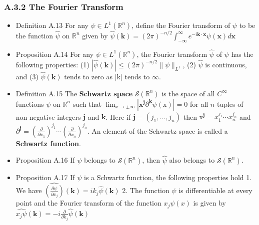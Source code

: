 \subsubsection{A.3.2 The Fourier Transform}

\begin{itemize}
\item Definition A.13 For any $\psi \in L^{1}\left(\mathbb{R}^{n}\right)$, define the Fourier transform of $\psi$ to be the function $\hat{\psi}$ on $\mathbb{R}^{n}$ given by $\hat{\psi}(\mathbf{k})=(2 \pi)^{-n / 2} \int_{-\infty}^{\infty} e^{-i \mathbf{k} \cdot \mathbf{x}} \psi(\mathbf{x}) d \mathbf{x}$

\item Proposition A.14 For any $\psi \in L^{1}\left(\mathbb{R}^{n}\right)$, the Fourier transform $\hat{\psi}$ of $\psi$ has the following properties: (1) $|\hat{\psi}(\mathbf{k})| \leq(2 \pi)^{-n / 2}\|\psi\|_{L^{1}}$, (2) $\hat{\psi}$ is continuous, and (3) $\hat{\psi}(\mathbf{k})$ tends to zero as $|\mathrm{k}|$ tends to $\infty$.

\item Definition A.15 The \textbf{Schwartz space} $\mathcal{S}\left(\mathbb{R}^{n}\right)$ is the space of all $C^{\infty}$ functions $\psi$ on $\mathbb{R}^{n}$ such that $\lim _{x \rightarrow \pm \infty}\left|\mathbf{x}^{\mathbf{j}} \partial^{\mathbf{k}} \psi(\mathrm{x})\right|=0$ for all $n$-tuples of non-negative integers $\mathbf{j}$ and $\mathbf{k}$. Here if $\mathbf{j}=\left(j_{1}, \ldots, j_{n}\right)$ then $\mathrm{x}^{\mathbf{j}}=x_{1}^{j_{1}} 	\cdots x_{n}^{j_{n}}$ and $\partial^{\mathbf{j}}=\left(\frac{\partial}{\partial x_{1}}\right)^{j_{1}} \cdots\left(\frac{\partial}{\partial x_{n}}\right)^{j_{n}}$. An element of the Schwartz space is called a \textbf{Schwartz function}.

\item Proposition A.16 If $\psi$ belongs to $\mathcal{S}\left(\mathbb{R}^{n}\right)$, then $\hat{\psi}$ also belongs to $\mathcal{S}\left(\mathbb{R}^{n}\right)$.

\item Proposition A.17 If $\psi$ is a Schwartz function, the following properties hold
1. We have $\widehat {\left({\frac{\partial \psi}{\partial x_{j}}}\right)}	 (\mathbf{k})=i k_{j} \hat{\psi}(\mathbf{k})$ 2. The function $\hat{\psi}$ is differentiable at every point and the Fourier transform of the function $x_{j} \psi(x)$ is given by $\widehat{x_{j} \psi}(\mathbf{k})=-i \frac{\partial}{\partial k_{j}} \hat{\psi}(\mathbf{k})$


\end{itemize}
